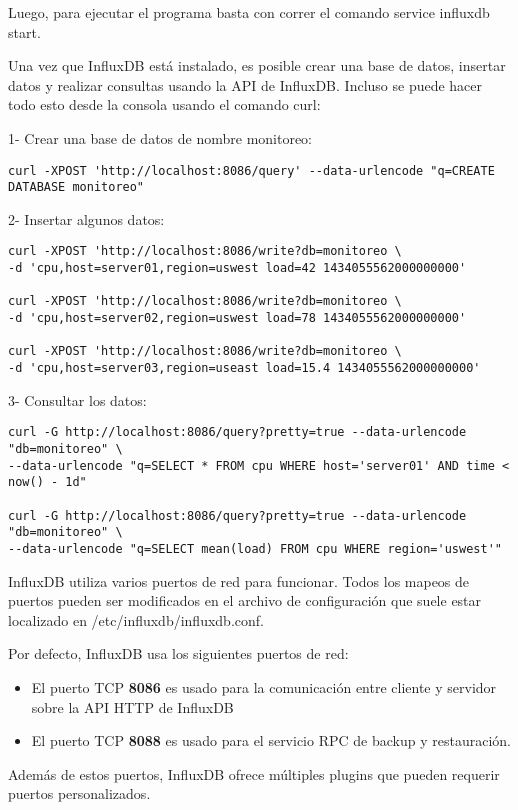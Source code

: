 Luego, para ejecutar el programa basta con correr el comando service influxdb
start.

Una vez que InfluxDB está instalado, es posible crear una base de datos,
insertar datos y realizar consultas usando la API de InfluxDB. Incluso se puede
hacer todo esto desde la consola usando el comando curl:

1- Crear una base de datos de nombre monitoreo:

\begin{lstlisting}
curl -XPOST 'http://localhost:8086/query' --data-urlencode "q=CREATE DATABASE monitoreo"
\end{lstlisting}

2- Insertar algunos datos:

\begin{lstlisting}
curl -XPOST 'http://localhost:8086/write?db=monitoreo \
-d 'cpu,host=server01,region=uswest load=42 1434055562000000000'

curl -XPOST 'http://localhost:8086/write?db=monitoreo \
-d 'cpu,host=server02,region=uswest load=78 1434055562000000000'

curl -XPOST 'http://localhost:8086/write?db=monitoreo \
-d 'cpu,host=server03,region=useast load=15.4 1434055562000000000'
\end{lstlisting}


3- Consultar los datos:

\begin{lstlisting}
curl -G http://localhost:8086/query?pretty=true --data-urlencode "db=monitoreo" \
--data-urlencode "q=SELECT * FROM cpu WHERE host='server01' AND time < now() - 1d"

curl -G http://localhost:8086/query?pretty=true --data-urlencode "db=monitoreo" \
--data-urlencode "q=SELECT mean(load) FROM cpu WHERE region='uswest'"
\end{lstlisting}

InfluxDB utiliza varios puertos de red para funcionar. Todos los mapeos de
puertos pueden ser modificados en el archivo de configuración que suele estar
localizado en /etc/influxdb/influxdb.conf.

Por defecto, InfluxDB usa los siguientes puertos de red:

\begin{itemize}

  \item
  El puerto TCP \textbf{8086} es usado para la comunicación entre cliente y
  servidor sobre la API HTTP de InfluxDB

  \item
  El puerto TCP \textbf{8088} es usado para el servicio RPC de backup y
  restauración.

\end{itemize}


Además de estos puertos, InfluxDB ofrece múltiples plugins que pueden requerir
puertos personalizados. 

